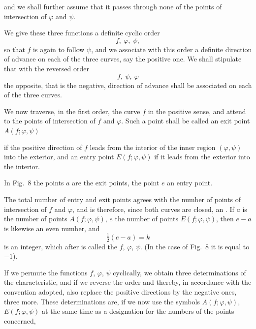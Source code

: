 and we shall further assume that it passes through none of the
points of intersection of $\varphi$ and $\psi$.

We give these three functions a definite cyclic order
\[
f,\ \varphi,\ \psi,
\]
so that $f$ is again to follow $\psi$, and we associate with this
order a definite direction of advance on each of the three curves,
say the positive one. We shall stipulate that with the reversed
order
\[
f,\ \psi,\ \varphi
\]
the opposite, that is the negative, direction of advance shall be
associated on each of the three curves.

We now traverse, in the first order, the curve $f$ in the
positive sense, and attend to the points of intersection of $f$
and $\varphi$. Such a point shall be called an exit point $A(f; \varphi, \psi)$


if the positive direction of $f$ leads from the interior of the
inner region $(\varphi, \psi)$ into the exterior, and an entry point
$E(f; \varphi, \psi)$ if it leads from the exterior into the interior.

In Fig.~8 the points $a$ are the exit points, the point
$e$ an entry point.

The total number of entry and exit points agrees with the
number of points of intersection of $f$ and $\varphi$, and is therefore, since
both curves are closed, an . If $a$ is the number
of points $A(f; \varphi, \psi)$, $e$ the number of points $E(f; \varphi, \psi)$, then
$e - a$ is likewise an even number, and
\[
\tfrac{1}{2}(e - a) = k
\]
is an integer, which after  is called the  $f$, $\varphi$, $\psi$. (In the case of Fig.~8
it is equal to $-1$).

If we permute the functions $f$, $\varphi$, $\psi$ cyclically, we
obtain three determinations of the characteristic, and if
we reverse the order and thereby, in accordance with the convention
adopted, also replace the positive directions by the negative
ones, three more. These determinations are, if we now use
the symbols $A(f; \varphi, \psi)$, $E(f; \varphi, \psi)$ at the same time as a designation
for the numbers of the points concerned,
